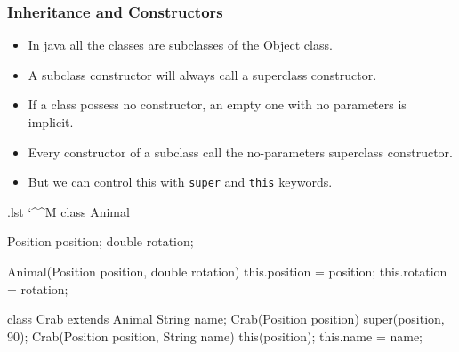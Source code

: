 \documentclass[10pt,handout]{beamer}
\makeatletter
\newenvironment{code}{%
  \begingroup
  \@bsphack
  \immediate\openout\lstvrb@out\jobname.lst
  \let\do\@makeother\dospecials\catcode`\^^M\active
  \def\verbatim@processline{%
    \immediate\write\lstvrb@out{\the\verbatim@line}}%
  \verbatim@start}{%
  \immediate\closeout\lstvrb@out
  \@esphack
  \endgroup
  
  \begin{alertblock}{}
    
  \end{alertblock}}
\makeatother
\begin{document}
\begin{frame}
  \frametitle{Inheritance and Constructors}
  \begin{itemize}
    \item In java all the classes are subclasses of the Object class. 
    \item A subclass constructor will always call a superclass constructor.
    \item If a class possess no constructor, an empty one with no parameters is implicit.
    \item Every constructor of a subclass call the no-parameters superclass constructor.
    \item But we can control this with \verb!super! and \verb!this! keywords.
  \end{itemize}
 \begin{center}
  \end{center}
\end{frame}

\begin{frame}
  \begin{code}
class Animal {
  Position position;
  double rotation;
    
  Animal(Position position, double rotation) {
    this.position = position;
    this.rotation = rotation;
  }
}

class Crab extends Animal{
  String name;
  Crab(Position position) {
    super(position, 90);
  }
  Crab(Position position, String name) {
    this(position);
    this.name = name;
  }
}
\end{code}
\end{frame}
\end{document}
